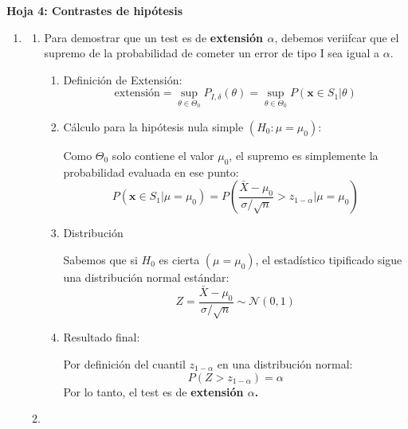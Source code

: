 \begin{center}
	\Large \textbf{Hoja 4: Contrastes de hipótesis}
\end{center}

\begin{enumerate}[label=\color{red}\textbf{\arabic*)}]
	\item {}
	      \begin{enumerate}[label=\color{red}\textbf{\alph*)}]
		      \item {}

		            Para demostrar que un test es de \textbf{extensión $\alpha$}, debemos veriifcar que el supremo de la probabilidad de cometer un error de tipo I sea igual a $\alpha$.
		            \begin{enumerate}[label=\arabic*)]
			            \item Definición de Extensión: \[
				                  \text{extensión}=\sup_{\theta\in \Theta_0}P_{I,\delta}(\theta)=\sup_{\theta\in \Theta_0}P(\mathbf{x}\in S_1|\theta)
			                  \]
			            \item Cálculo para la hipótesis nula simple $(H_0:\mu=\mu_0)$:

			                  Como $\Theta_0$ solo contiene el valor $\mu_0$, el supremo es simplemente la probabilidad evaluada en ese punto: \[
				                  P(\mathbf{x}\in S_1|\mu=\mu_0)=P \left( \dfrac{\bar{X}-\mu_0}{\sigma / \sqrt{n} }>z_{1-\alpha}|\mu=\mu_0 \right)
			                  \]
			            \item Distribución

			                  Sabemos que si $H_0$ es cierta $(\mu=\mu_0)$, el estadístico tipificado sigue una distribución normal estándar: \[
				                  Z=\dfrac{\bar{X}-\mu_0}{\sigma / \sqrt{n} }\sim \mathcal{N}(0,1)
			                  \]
			            \item Resultado final:

			                  Por definición del cuantil $z_{1-\alpha}$ en una distribución normal: \[
				                  P(Z>z_{1-\alpha})=\alpha
			                  \]
			                  Por lo tanto, el test es de \textbf{extensión $\alpha$.}
		            \end{enumerate}
		      \item {}


\end{enumerate}
\end{enumerate}
